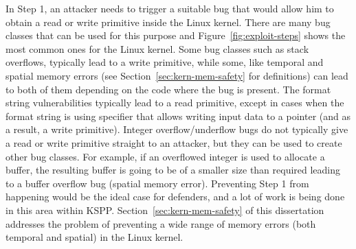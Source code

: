 In Step 1, an attacker needs to trigger a suitable bug that would allow him to obtain a read or write primitive inside the Linux kernel. There are many bug classes that can be used for this purpose and Figure~\ref{fig:exploit-steps} shows the most common ones for the Linux kernel. Some bug classes such as stack overflows, typically lead to a write primitive, while some, like temporal and spatial memory errors (see Section~\ref{sec:kern-mem-safety} for definitions) can lead to both of them depending on the code where the bug is present. The format string vulnerabilities typically lead to a read primitive, except in cases when the format string is using  specifier that allows writing input data to a pointer (and as a result, a write primitive). Integer overflow/underflow bugs do not typically give a read or write primitive straight to an attacker, but they can be used to create other bug classes. For example, if an overflowed integer is used to allocate a buffer, the resulting buffer is going to be of a smaller size than required leading to a buffer overflow bug (spatial memory error). Preventing Step 1 from happening would be the ideal case for defenders, and a lot of work is being done in this area within KSPP. Section~\ref{sec:kern-mem-safety} of this dissertation addresses the problem of preventing a wide range of memory errors (both temporal and spatial) in the Linux kernel. 

